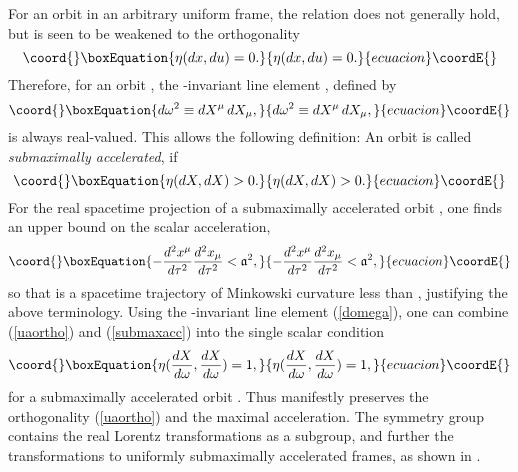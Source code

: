 \documentclass[a4paper,aps,prd,showkeys,showpacs,superscriptaddress,preprint]{revtex4}
\providecommand{\pc}{\mathbb{P}}
\providecommand{\reals}{\mathbb{R}}
\begin{document}
For an orbit \coordHE{} in an arbitrary uniform frame,
the relation \coordHE{} does not generally hold, but is seen 
\cite{Schuller:2002fn} to be
weakened to the orthogonality 
\begin{equation}\coord{}\boxEquation{\label{uaortho}
  \eta(dx,du) = 0.
}{\eta(dx,du) = 0.
}{ecuacion}\coordE{}\end{equation}
Therefore, for an orbit \coordHE{}, the \myHighlight{$SO_\pc(1,n)$}\coordHE{}-invariant line element
\coordHE{}, defined by
\begin{equation}\coord{}\boxEquation{\label{domega}
  d\omega^2 \equiv dX^\mu\, dX_\mu,
}{d\omega^2 \equiv dX^\mu\, dX_\mu,
}{ecuacion}\coordE{}\end{equation}
is always real-valued. This allows the following definition:
An orbit \coordHE{} is called \textsl{submaximally accelerated}, if
\begin{equation}\coord{}\boxEquation{\label{submaxacc}
  \eta(dX,dX) > 0.
}{\eta(dX,dX) > 0.
}{ecuacion}\coordE{}\end{equation}
For the real spacetime projection \myHighlight{$x: \reals \longrightarrow
\reals^{1,n}$}\coordHE{} of a submaximally accelerated orbit \coordHE{}, one finds an upper bound on the scalar acceleration,
\begin{equation}\coord{}\boxEquation{
  - \frac{d^2x^\mu}{d\tau^2} \frac{d^2x_\mu}{d\tau^2} < \mathfrak{a}^2,
}{
  - \frac{d^2x^\mu}{d\tau^2} \frac{d^2x_\mu}{d\tau^2} < \mathfrak{a}^2,
}{ecuacion}\coordE{}\end{equation} 
so that \coordHE{} is a spacetime trajectory of Minkowski curvature less than
\coordHE{}, justifying the above terminology.
Using the \myHighlight{$SO_\pc(1,n)$}\coordHE{}-invariant line element (\ref{domega}),
one can combine (\ref{uaortho}) and (\ref{submaxacc}) into the single
scalar condition 
\begin{equation}\coord{}\boxEquation{
  \eta(\frac{dX}{d\omega}, \frac{dX}{d\omega}) = 1,
}{
  \eta(\frac{dX}{d\omega}, \frac{dX}{d\omega}) = 1,
}{ecuacion}\coordE{}\end{equation}
for a submaximally accelerated orbit \coordHE{}. Thus \myHighlight{$SO_\pc(1,3)$}\coordHE{} manifestly
preserves the orthogonality (\ref{uaortho}) and the maximal
acceleration. 
The symmetry group \myHighlight{$SO_\pc(1,n)$}\coordHE{} contains the real Lorentz
transformations as a subgroup, and further the transformations to
uniformly submaximally accelerated frames, as shown in
\cite{Schuller:2002fn}.\\ 
\end{document}
